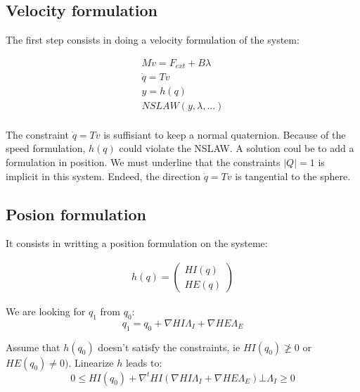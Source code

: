 \subsection{Velocity formulation}

The first step consists in doing a velocity formulation of the system:

\begin{equation}
\label{NE_Dyn1}
\begin{array}{l}
  M \dot v = F_{ext}+B \lambda \\
  \dot q = T v\\
  y=h(q) \\
  NSLAW(y,\lambda,...)\\
\end{array}
\end{equation}

The constraint $\dot q = T v$ is suffisiant to keep a normal quaternion. Because of the speed formulation, $h(q)$ could violate the NSLAW. A solution coul be to add a formulation in position. We must underline that the constraints $\mid Q \mid = 1$ is implicit in this system. Endeed, the direction  $\dot q = T v$ is tangential to the sphere. 


\subsection{Posion formulation}

It consists in writting a position formulation on the systeme:

\begin{equation}
\label{NE_Dyn1}
\begin{array}{l}
h(q) = \left(\begin{array}{l}
  HI(q)\\HE(q)
\end{array}\right)
\end{array}
\end{equation}


We are looking for $q_1$ from $q_0$:\\
\begin{equation}
  q_1=q_0+\nabla HI \Lambda _I + \nabla HE \Lambda _E
\end{equation}

Assume that $h(q_0)$ doesn't satisfy the constraints, ie $ HI(q_0) \ngeq 0$ or $ HE(q_0) \neq 0)$. Linearize $h$ leads to:\\
\begin{equation}
  0 \leq HI(q_0) + \nabla ^t HI (\nabla HI  \Lambda _I + \nabla HE \Lambda _E) \bot \Lambda _I \geq 0
\end{equation}

